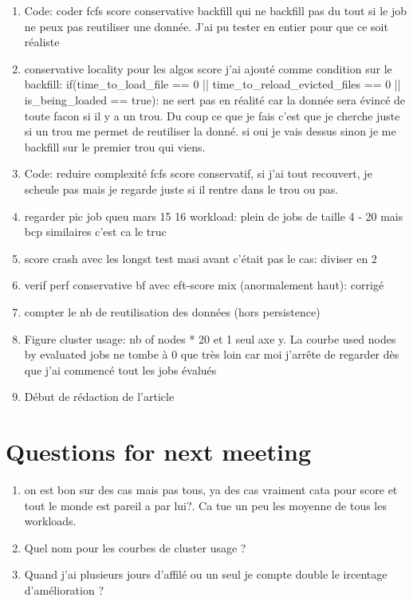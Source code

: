 \documentclass[a4paper]{article}
\begin{document}
\begin{enumerate}
		\item Code: coder fcfs score conservative backfill qui ne backfill pas du tout si le job ne peux pas reutiliser une donnée. J'ai pu tester en entier pour que ce soit réaliste
		\item conservative locality pour les algos score j'ai ajouté comme condition sur le backfill: if(time\_to\_load\_file == 0 || time\_to\_reload\_evicted\_files == 0 || is\_being\_loaded == true): ne sert pas en réalité car la donnée sera évincé de toute facon si il y a un trou. Du coup ce que je fais c'est que je cherche juste si un trou me permet de reutiliser la donné. si oui je vais dessus sinon je me backfill sur le premier trou qui viens.
		\item Code: reduire complexité fcfs score conservatif, si j'ai tout recouvert, je scheule pas mais je regarde juste si il rentre dans le trou ou pas.
		\item regarder pic job queu mars 15 16 workload: plein de jobs de taille 4 - 20 mais bcp similaires c'est ca le truc
		\item score crash avec les longst test masi avant c'était pas le cas: diviser en 2
		\item verif perf conservative bf avec eft-score mix (anormalement haut): corrigé

		\item compter le nb de reutilisation des données (hors persistence)
		\item Figure cluster usage: nb of nodes * 20 et 1 seul axe y. La courbe used nodes by evaluated jobs ne tombe à 0 que très loin car moi j'arrête de regarder dès que j'ai commencé tout les jobs évalués
		\item Début de rédaction de l'article
	\end{enumerate}
	
\section{Questions for next meeting}
	\begin{enumerate}
		\item on est bon sur des cas mais pas tous,  ya des cas vraiment cata pour score et tout le monde est pareil a par lui?. Ca tue un peu les moyenne de tous les workloads.
		\item Quel nom pour les courbes de cluster usage ?
		\item Quand j'ai plusieurs jours d'affilé ou un seul je compte double le ircentage d'amélioration ?
	\end{enumerate}
	
\end{document}

